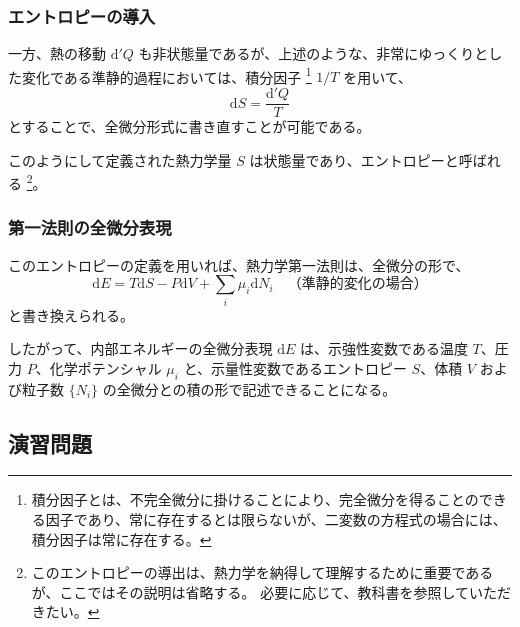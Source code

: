 \documentclass[uplatex,dvipdfmx,a4paper,11pt]{jsarticle}
\newcommand{\diff}{\mathrm d}
\begin{document}
\subsubsection{エントロピーの導入}

一方、熱の移動 $\diff' Q$ も非状態量であるが、上述のような、非常にゆっくりとした変化である準静的過程においては、積分因子
\footnote
{
積分因子とは、不完全微分に掛けることにより、完全微分を得ることのできる因子であり、常に存在するとは限らないが、二変数の方程式の場合には、積分因子は常に存在する。
} $1/T$ を用いて、
\begin{equation}
\diff S = \dfrac{\diff' Q}{T}
\end{equation}
とすることで、全微分形式に書き直すことが可能である。

このようにして定義された熱力学量 $S$ は状態量であり、エントロピーと呼ばれる
\footnote
{
このエントロピーの導出は、熱力学を納得して理解するために重要であるが、ここではその説明は省略する。
必要に応じて、教科書を参照していただきたい。
}。

\subsubsection{第一法則の全微分表現}

このエントロピーの定義を用いれば、熱力学第一法則は、全微分の形で、
\begin{equation}
\diff E = T \diff S - P \diff V + \sum_i \mu_i \diff N_i \quad \text{（準静的変化の場合）}
\label{eq:1st_low_der}
\end{equation}	
と書き換えられる。

したがって、内部エネルギーの全微分表現 $\diff E$ は、示強性変数である温度 $T$、圧力 $P$、化学ポテンシャル $\mu_i$ と、示量性変数であるエントロピー $S$、体積 $V$ および粒子数 $\{ N_i \}$ の全微分との積の形で記述できることになる。
\newpage

\subsection{演習問題}
\end{document}
